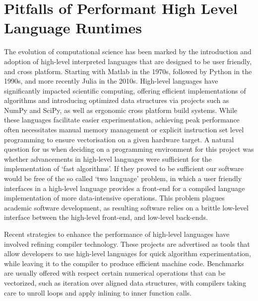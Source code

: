 \section{Pitfalls of Performant High Level Language Runtimes}\label{chpt:1:sec:1}

The evolution of computational science has been marked by the introduction and adoption of high-level interpreted languages that are designed to be user friendly, and cross platform. Starting with Matlab in the 1970s, followed by Python in the 1990s, and more recently Julia in the 2010s. High-level languages have significantly impacted scientific computing, offering efficient implementations of algorithms and introducing optimized data structures via projects such as NumPy and SciPy, as well as ergonomic cross platform build systems. While these languages facilitate easier experimentation, achieving peak performance often necessitates manual memory management or explicit instruction set level programming to ensure vectorisation on a given hardware target. A natural question for us when deciding on a programming environment for this project was whether advancements in high-level languages were sufficient for the implementation of `fast algorithms'. If they proved to be sufficient our software would be free of the so called `two language' problem, in which a user friendly interfaces in a high-level language provides a front-end for a compiled language implementation of more data-intensive operations. This problem plagues academic software development, as resulting software relies on a brittle low-level interface between the high-level front-end, and low-level back-ends.

Recent strategies to enhance the performance of high-level languages have involved refining compiler technology. These projects are advertised as tools that allow developers to use high-level languages for quick algorithm experimentation, while leaving it to the compiler to produce efficient machine code. Benchmarks are usually offered with respect certain numerical operations that can be vectorized, such as iteration over aligned data structures, with compilers taking care to unroll loops and apply inlining to inner function calls.

